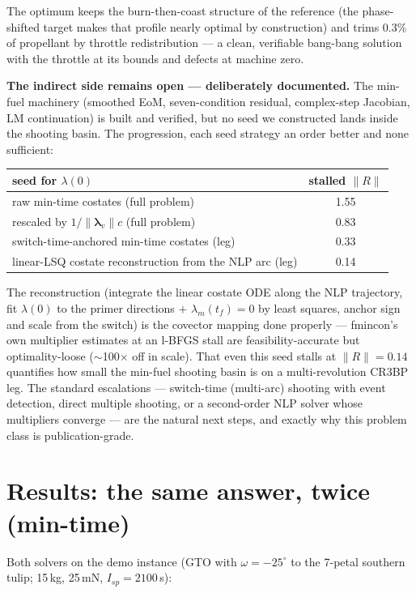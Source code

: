 \documentclass[11pt,letterpaper]{article}
\theoremstyle{noteplain}
\newcommand{\lamv}{\bm{\lambda}_v}
\newcommand{\lamm}{\lambda_m}
\begin{document}
The optimum keeps the burn-then-coast structure of the reference (the
phase-shifted target makes that profile nearly optimal by construction)
and trims 0.3\% of propellant by throttle redistribution --- a clean,
verifiable bang-bang solution with the throttle at its bounds and
defects at machine zero.

\textbf{The indirect side remains open --- deliberately documented.} The
min-fuel machinery (smoothed EoM, seven-condition residual, complex-step
Jacobian, LM continuation) is built and verified, but no seed we
constructed lands inside the shooting basin. The progression, each seed
strategy an order better and none sufficient:
\begin{center}
\begin{tabular}{lc}
\toprule
seed for $\lambda(0)$ & stalled $\|R\|$ \\
\midrule
raw min-time costates (full problem)            & 1.55 \\
rescaled by $1/\|\lamv\|c$ (full problem)      & 0.83 \\
switch-time-anchored min-time costates (leg)    & 0.33 \\
linear-LSQ costate reconstruction from the NLP arc (leg) & 0.14 \\
\bottomrule
\end{tabular}
\end{center}
The reconstruction (integrate the linear costate ODE along the NLP
trajectory, fit $\lambda(0)$ to the primer directions $+$
$\lamm(t_f)=0$ by least squares, anchor sign and scale from the switch)
is the covector mapping done properly --- fmincon's own multiplier
estimates at an l-BFGS stall are feasibility-accurate but
optimality-loose ($\sim$100$\times$ off in scale). That even this seed
stalls at $\|R\| = 0.14$ quantifies how small the min-fuel shooting
basin is on a multi-revolution CR3BP leg. The standard escalations ---
switch-time (multi-arc) shooting with event detection, direct multiple
shooting, or a second-order NLP solver whose multipliers converge --- are
the natural next steps, and exactly why this problem class is
publication-grade.

\section{Results: the same answer, twice (min-time)}

Both solvers on the demo instance (GTO with $\omega=-25^\circ$ to the
7-petal southern tulip; 15\,kg, 25\,mN, $I_{sp} = 2100$\,s):
\end{document}
